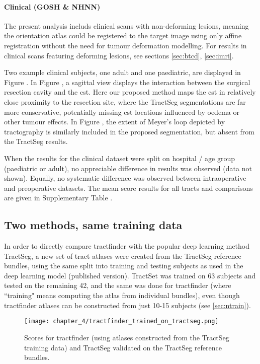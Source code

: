 \paragraph*{Clinical (GOSH \& NHNN)}

The present analysis includs clinical scans with non-deforming lesions, meaning the orientation atlas could be registered to the target image using only affine registration without the need for tumour deformation modelling.
For results in clinical scans featuring deforming lesions, see sections \ref{sec:btcd}, \ref{sec:imri}. %

Two example clinical subjects, one adult and one paediatric, are displayed in Figure .
In Figure , a sagittal view displays the interaction between the surgical resection cavity and the \gls{cst}.
Here our proposed method maps the \gls{cst} in relatively close proximity to the resection site, where the TractSeg segmentations are far more conservative, potentially missing \gls{cst} locations influenced by oedema or other tumour effects.
In Figure , the extent of Meyer's loop depicted by tractography is similarly included in the proposed segmentation, but absent from the TractSeg results.

When the results for the clinical dataset were split on hospital / age group (paediatric or adult), no appreciable difference in results was observed (data not shown).
Equally, no systematic difference was observed between intraoperative and preoperative datasets.
The mean score results for all tracts and comparisons are given in Supplementary Table .

\subsection{Two methods, same training data}

In order to directly compare tractfinder with the popular deep learning method TractSeg, a new set of tract atlases were created from the TractSeg reference bundles, using the same split into training and testing subjects as used in the deep learning model (published version).
TractSet was trained on 63 subjects and tested on the remaining 42, and the same was done for tractfinder (where ``training" means computing the atlas from individual bundles), even though tractfinder atlases can be constructed from just 10-15 subjects (see \ref{sec:ntrain}).

\begin{figure}[htb!]
  \texttt{[image: chapter\_4/tractfinder\_trained\_on\_tractseg.png]}
  \caption{Scores for tractfinder (using atlases constructed from the TractSeg training data) and TractSeg validated on the TractSeg reference bundles.}
  \label{fig:ts_atlas}
\end{figure}

